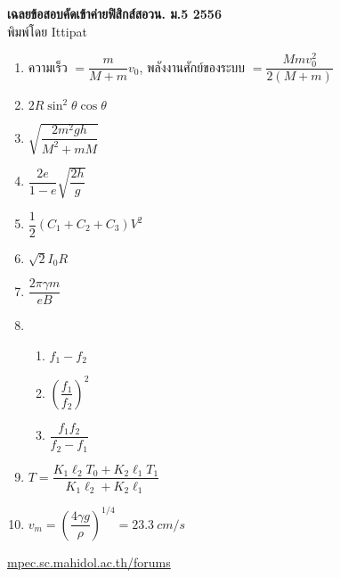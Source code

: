 \documentclass[a4paper,12pt]{article}
\begin{document}
\thispagestyle{empty}
\begin{center}
	{\huge \textbf{เฉลยข้อสอบคัดเข้าค่ายฟิสิกส์สอวน. ม.\textenglish{5} 2556}}\\
	พิมพ์โดย Ittipat\\
\end{center}
\begin{enumerate}
	\item ความเร็ว \(=\dfrac{m}{M+m}v_0\), พลังงานศักย์ของระบบ \(=\dfrac{Mmv_0^2}{2(M+m)}\)
	\item \(2R\sin ^2\theta \cos \theta \)
	\item \(\sqrt{\dfrac{2m^{2}gh}{M^{2}+mM}}\)
	\item \(\dfrac{2e}{1-e}\sqrt{\dfrac{2h}{g}}\)
	\item \(\dfrac{1}{2} ( C_{1} + C_{2} + C_{3} ) V^{2}\)
	\item \(\sqrt{2}I_0R\)
	\item \(\dfrac{2\pi \gamma m}{eB}\)
	\item \
	\begin{enumerate}
		\item \(f_{1}-f_{2}\)
		\item \(\left(\dfrac{f_{1}}{f_{2}}\right)^{2}\)
		\item \(\dfrac{f_{1}f_{2}}{f_{2}-f_{1}}\)
	\end{enumerate}
	\item \(T=\dfrac{K_1\ell_2T_0+K_2\ell_1T_1}{K_1\ell_2+K_2\ell_1}\)
	\item \(v_m=\left(\dfrac{4\gamma g}{\rho }\right)^{1/4}=\SI{23.3}{cm/s}\)
\end{enumerate}
\vfill	
\begin{center}
	\href{http://mpec.sc.mahidol.ac.th/forums/}{mpec.sc.mahidol.ac.th/forums}
\end{center}
\end{document}
